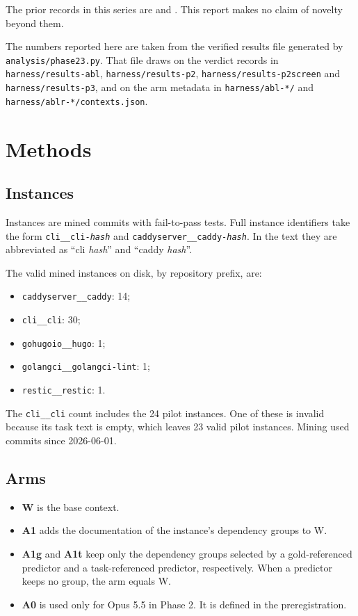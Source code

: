 \documentclass[11pt,a4paper]{article}
\newcommand{\inst}[1]{\texttt{#1}}
\begin{document}
The prior records in this series are \cite{prior} and \cite{pilot}. This report makes no claim of novelty beyond them.

The numbers reported here are taken from the verified results file generated by \texttt{analysis/phase23.py}. That file draws on the verdict records in \texttt{harness/results-abl}, \texttt{harness/results-p2}, \texttt{harness/results-p2screen} and \texttt{harness/results-p3}, and on the arm metadata in \texttt{harness/abl-*/} and \texttt{harness/ablr-*/contexts.json}.

\section{Methods}

\subsection{Instances}

Instances are mined commits with fail-to-pass tests. Full instance identifiers take the form \inst{cli\_\_cli-\textit{hash}} and \inst{caddyserver\_\_caddy-\textit{hash}}. In the text they are abbreviated as ``cli \textit{hash}'' and ``caddy \textit{hash}''.

The valid mined instances on disk, by repository prefix, are:
\begin{itemize}
\item \inst{caddyserver\_\_caddy}: 14;
\item \inst{cli\_\_cli}: 30;
\item \inst{gohugoio\_\_hugo}: 1;
\item \inst{golangci\_\_golangci-lint}: 1;
\item \inst{restic\_\_restic}: 1.
\end{itemize}

The \inst{cli\_\_cli} count includes the 24 pilot instances. One of these is invalid because its task text is empty, which leaves 23 valid pilot instances. Mining used commits since 2026-06-01.

\subsection{Arms}

\begin{itemize}
\item \textbf{W} is the base context.
\item \textbf{A1} adds the documentation of the instance's dependency groups to W.
\item \textbf{A1g} and \textbf{A1t} keep only the dependency groups selected by a gold-referenced predictor and a task-referenced predictor, respectively. When a predictor keeps no group, the arm equals W.
\item \textbf{A0} is used only for Opus 5.5 in Phase 2. It is defined in the preregistration.
\end{itemize}
\end{document}
